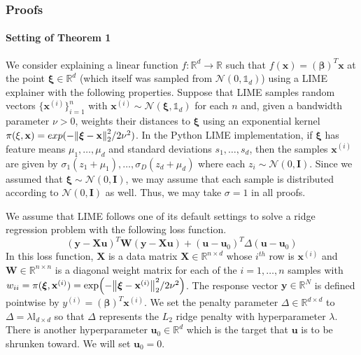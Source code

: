 \documentclass[mnsc,blindrev]{informs3}
\begin{document}
        \subsubsection{Proofs}
        \paragraph{Setting of Theorem 1}
            We consider explaining a linear function $f:\mathbb{R}^d \rightarrow \mathbb{R}$ such that $f(\mathbf{x}) = (\boldsymbol{\beta})^T \mathbf{x}$ at the point $\boldsymbol{\xi}\in \mathbb{R}^d$ (which itself was sampled from $\mathcal{N}(0, \mathds{1}_d)$) using a LIME explainer with the following properties. Suppose that LIME samples random vectors $\{\mathbf{x}^{(i)}\}_{i=1}^n$ with $\mathbf{x}^{(i)} \sim \mathcal{N}(\boldsymbol{\xi},\mathds{1}_d)$ for each $n$ and, given a bandwidth parameter $\nu > 0$, weights their distances to $\boldsymbol{\xi}$ using an exponential kernel $\pi(\xi,\mathbf{x}) = exp(-\norm{\boldsymbol{\xi} - \mathbf{x}}_2^2/2\nu^2)$. In the Python LIME implementation, if $\boldsymbol{\xi}$ has feature means $\mu_1,\ldots,\mu_d$ and standard deviations $s_1,\ldots,s_d$, then the samples $\mathbf{x}^{(i)}$ are given by $\sigma_1(z_1 + \mu_1),\ldots,\sigma_D(z_d + \mu_d)$ where each $z_i\sim \mathcal{N}(0,\mathbf{I})$. Since we assumed that $\boldsymbol{\xi} \sim \mathcal{N}(0,\mathbf{I})$, we may assume that each sample is distributed according to $\mathcal{N}(0,\mathbf{I})$ as well. Thus, we may take $\sigma = 1$ in all proofs. 
        
        We assume that LIME follows one of its default settings to solve a ridge regression problem with the following loss function.
        \begin{equation*}
            (\mathbf{y} - \mathbf{X}\mathbf{u})^T \mathbf{W}(\mathbf{y} - \mathbf{X}\mathbf{u}) + (\mathbf{u} - \mathbf{u}_0)^T \Delta(\mathbf{u} - \mathbf{u}_0)
        \end{equation*}
        In this loss function, $\mathbf{X}$ is a data matrix $\mathbf{X} \in \mathbb{R}^{n\times d}$ whose $i^{th}$ row is $\mathbf{x}^{(i)}$ and $\mathbf{W} \in \mathbb{R}^{n\times n}$ is a diagonal weight matrix for each of the $i=1,\ldots,n$ samples with $w_{ii} = \pi(\boldsymbol{\xi},\mathbf{x}^{(i)}) = \exp(-\norm{\boldsymbol{\xi} - \mathbf{x}^{(i)}}_2^2/2\nu^2)$. The response vector $\mathbf{y}\in \mathbb{R}^N$ is defined pointwise by $y^{(i)} = (\boldsymbol{\beta})^T \mathbf{x}^{(i)}$. We set the penalty parameter $\Delta\in \mathbb{R}^{d\times d}$ to $\Delta = \lambda \mathds{I}_{d\times d}$ so that $\Delta$ represents the $L_2$ ridge penalty with hyperparameter $\lambda$. There is another hyperparameter $\mathbf{u}_0 \in \mathbb{R}^d$ which is the target that $\mathbf{u}$ is to be shrunken toward.  We will set $\mathbf{u}_0 = 0$.
\end{document}
